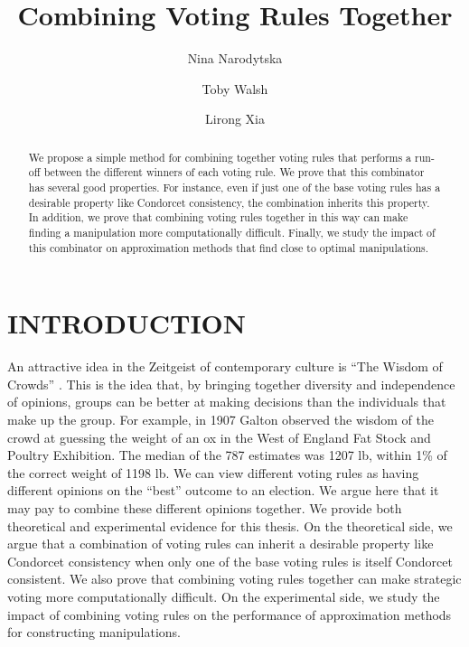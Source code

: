\documentclass{ecai2012}
\begin{document}
\title{Combining Voting Rules Together}

\author{Nina Narodytska \and Toby Walsh \and Lirong Xia }



\maketitle


\begin{abstract}
We propose a simple method for combining together
voting rules that performs a run-off between
the different winners of each voting rule.
We prove that this combinator has several
good properties. For instance, even if just
one of the base voting rules has a desirable
property like Condorcet consistency,
the combination inherits this property. In addition, we prove
that combining voting rules together in this
way can make finding a manipulation more
computationally difficult. Finally,
we study the impact of this combinator
on approximation methods that
find close to optimal manipulations.
\end{abstract}

\section{INTRODUCTION}

An attractive idea in the Zeitgeist of
contemporary culture is ``The Wisdom of Crowds''
\cite{wisdomcrowds}. This is the idea
that, by bringing together diversity
and independence of opinions,
groups can be better at making decisions than
the individuals that make up the group.
For example, in 1907 Galton observed the
wisdom of the crowd at guessing the weight
of an ox in the West of England Fat Stock and
Poultry Exhibition. The median of the 787 estimates
was 1207 lb, within 1\% of the correct weight of
1198 lb.
We can view different voting rules as having
different opinions on the ``best'' outcome
to an election. We argue here
that it may pay to combine these different opinions together.
We provide both theoretical and experimental
evidence for this thesis. On the theoretical
side, we argue that a combination of voting rules
can inherit a desirable property like
Condorcet consistency when only one of the base
voting rules is itself Condorcet consistent.
We also prove that combining
voting rules together can make strategic voting
more computationally difficult.
On the experimental
side, we study the impact of combining
voting rules on the performance of approximation methods
for constructing manipulations.
\end{document}
